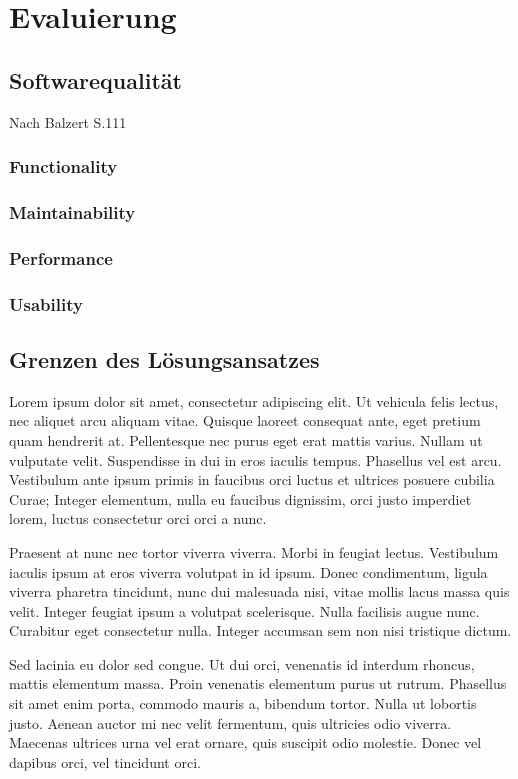 \documentclass[12pt,oneside,a4paper,parskip]{scrbook}
\begin{document}
\chapter{Evaluierung}
\section{Softwarequalität}
Nach Balzert S.111
\subsection{Functionality}
\subsection{Maintainability}
\subsection{Performance}
\subsection{Usability}
\section{Grenzen des Lösungsansatzes}

Lorem ipsum dolor sit amet, consectetur adipiscing elit. Ut vehicula felis lectus, nec aliquet arcu aliquam vitae. Quisque laoreet consequat ante, eget pretium quam hendrerit at. Pellentesque nec purus eget erat mattis varius. Nullam ut vulputate velit. Suspendisse in dui in eros iaculis tempus. Phasellus vel est arcu. Vestibulum ante ipsum primis in faucibus orci luctus et ultrices posuere cubilia Curae; Integer elementum, nulla eu faucibus dignissim, orci justo imperdiet lorem, luctus consectetur orci orci a nunc.

Praesent at nunc nec tortor viverra viverra. Morbi in feugiat lectus. Vestibulum iaculis ipsum at eros viverra volutpat in id ipsum. Donec condimentum, ligula viverra pharetra tincidunt, nunc dui malesuada nisi, vitae mollis lacus massa quis velit. Integer feugiat ipsum a volutpat scelerisque. Nulla facilisis augue nunc. Curabitur eget consectetur nulla. Integer accumsan sem non nisi tristique dictum.

Sed lacinia eu dolor sed congue. Ut dui orci, venenatis id interdum rhoncus, mattis elementum massa. Proin venenatis elementum purus ut rutrum. Phasellus sit amet enim porta, commodo mauris a, bibendum tortor. Nulla ut lobortis justo. Aenean auctor mi nec velit fermentum, quis ultricies odio viverra. Maecenas ultrices urna vel erat ornare, quis suscipit odio molestie. Donec vel dapibus orci, vel tincidunt orci.
\end{document}
